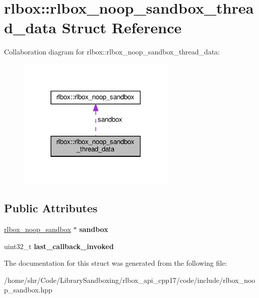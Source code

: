 \hypertarget{structrlbox_1_1rlbox__noop__sandbox__thread__data}{}\section{rlbox\+:\+:rlbox\+\_\+noop\+\_\+sandbox\+\_\+thread\+\_\+data Struct Reference}
\label{structrlbox_1_1rlbox__noop__sandbox__thread__data}


Collaboration diagram for rlbox\+:\+:rlbox\+\_\+noop\+\_\+sandbox\+\_\+thread\+\_\+data\+:
\nopagebreak
\begin{figure}[H]
\begin{center}
\leavevmode
\includegraphics[width=213pt]{structrlbox_1_1rlbox__noop__sandbox__thread__data__coll__graph}
\end{center}
\end{figure}
\subsection*{Public Attributes}
\begin{DoxyCompactItemize}
\item 
\mbox{\label{structrlbox_1_1rlbox__noop__sandbox__thread__data_aa4022aa2e2b1433c9c98ad77ad47ac22}} 
\hyperlink{classrlbox_1_1rlbox__noop__sandbox}{rlbox\+\_\+noop\+\_\+sandbox} $\ast$ {\bfseries sandbox}
\item 
\mbox{\label{structrlbox_1_1rlbox__noop__sandbox__thread__data_aca401c5a2cd7e67ed305db3757f28d84}} 
uint32\+\_\+t {\bfseries last\+\_\+callback\+\_\+invoked}
\end{DoxyCompactItemize}


The documentation for this struct was generated from the following file\+:\begin{DoxyCompactItemize}
\item 
/home/shr/\+Code/\+Library\+Sandboxing/rlbox\+\_\+api\+\_\+cpp17/code/include/rlbox\+\_\+noop\+\_\+sandbox.\+hpp\end{DoxyCompactItemize}

